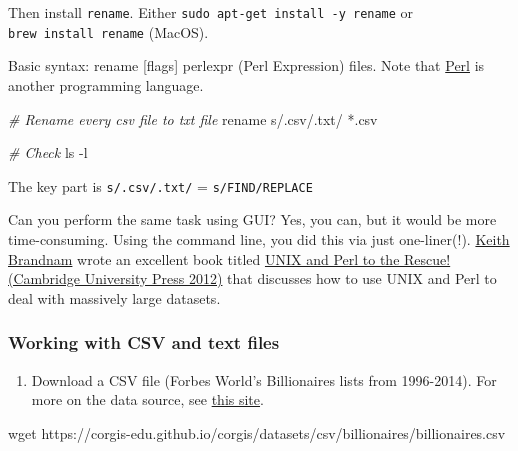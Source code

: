 \documentclass[
]{book}
\newenvironment{Shaded}{\begin{snugshade}}{\end{snugshade}}
\newcommand{\CommentTok}[1]{\textcolor[rgb]{0.56,0.35,0.01}{\textit{#1}}}
\newcommand{\ExtensionTok}[1]{#1}
\newcommand{\FunctionTok}[1]{\textcolor[rgb]{0.00,0.00,0.00}{#1}}
\newcommand{\NormalTok}[1]{#1}
\newcommand{\StringTok}[1]{\textcolor[rgb]{0.31,0.60,0.02}{#1}}
\providecommand{\tightlist}{%
  \setlength{\itemsep}{0pt}\setlength{\parskip}{0pt}}
\begin{document}
Then install \texttt{rename}. Either \texttt{sudo\ apt-get\ install\ -y\ rename} or \texttt{brew\ install\ rename} (MacOS).

Basic syntax: rename {[}flags{]} perlexpr (Perl Expression) files. Note that \href{https://en.wikipedia.org/wiki/Perl}{Perl} is another programming language.

\begin{Shaded}
\begin{Highlighting}[]
\CommentTok{\# Rename every csv file to txt file }
\ExtensionTok{rename} \StringTok{\textquotesingle{}s/.csv/.txt/\textquotesingle{}}\NormalTok{ *.csv}

\CommentTok{\# Check }
\FunctionTok{ls}\NormalTok{ {-}l}
\end{Highlighting}
\end{Shaded}

The key part is \texttt{s/.csv/.txt/} = \texttt{s/FIND/REPLACE}

Can you perform the same task using GUI? Yes, you can, but it would be more time-consuming. Using the command line, you did this via just one-liner(!). \href{http://korflab.ucdavis.edu/Bios/bio_keithb.html}{Keith Brandnam} wrote an excellent book titled \href{https://www.amazon.com/Unix-Perl-Rescue-Keith-Bradnam/dp/0521169828}{UNIX and Perl to the Rescue! (Cambridge University Press 2012)} that discusses how to use UNIX and Perl to deal with massively large datasets.

\hypertarget{working-with-csv-and-text-files}{%
\subsubsection{Working with CSV and text files}\label{working-with-csv-and-text-files}}

\begin{enumerate}
\def\labelenumi{\arabic{enumi}.}
\tightlist
\item
  Download a CSV file (Forbes World's Billionaires lists from 1996-2014). For more on the data source, see \href{https://corgis-edu.github.io/corgis/csv/billionaires/}{this site}.
\end{enumerate}

\begin{Shaded}
\begin{Highlighting}[]
\FunctionTok{wget}\NormalTok{ https://corgis{-}edu.github.io/corgis/datasets/csv/billionaires/billionaires.csv}
\end{Highlighting}
\end{Shaded}
\end{document}
